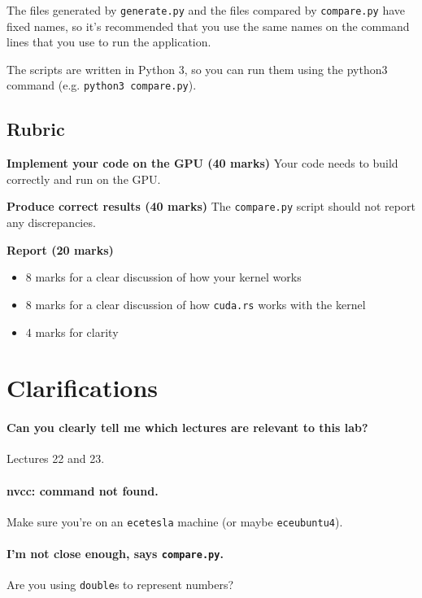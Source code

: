 The files generated by \texttt{generate.py} and the files compared by \texttt{compare.py} have fixed names, so it's recommended that you use the same names on the command lines that you use to run the application.

The scripts are written in Python 3, so you can run them using the python3 command (e.g. \texttt{python3 compare.py}).


\subsection*{Rubric }

\textbf{Implement your code on the GPU (40 marks) } Your code needs to build correctly and run on the GPU.

\textbf{Produce correct results (40 marks)} The \texttt{compare.py} script should not report any discrepancies.

\textbf{Report (20 marks) }


\begin{itemize}
	\item 8 marks for a clear discussion of how your kernel works

	\item 8 marks for a clear discussion of how \texttt{cuda.rs} works with the kernel

	\item 4 marks for clarity
\end{itemize}

\section*{Clarifications}

\paragraph{Can you clearly tell me which lectures are relevant to this lab?} Lectures 22 and 23.

\paragraph{nvcc: command not found.} Make sure you're on an \texttt{ecetesla} machine (or maybe \texttt{eceubuntu4}).

\paragraph{I'm not close enough, says \texttt{compare.py}.} Are you using \texttt{double}s to represent numbers?

